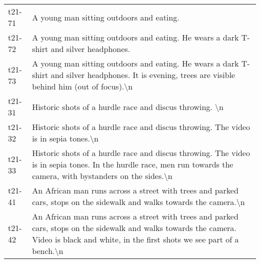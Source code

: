 \begin{tabular}{ll}
t21-71 &                                                                                                                                                                                                                                                                     A young man sitting outdoors and eating. \\
t21-72 &                                                                                                                                                                                                                      A young man sitting outdoors and eating. He wears a dark T-shirt and silver headphones. \\
t21-73 &                                                                                                                                                        A young man sitting outdoors and eating. He wears a dark T-shirt and silver headphones. It is evening, trees are visible behind him (out of focus).\textbackslash n \\
t21-31 &                                                                                                                                                                                                                                                      Historic shots of a hurdle race and discus throwing. \textbackslash n \\
t21-32 &                                                                                                                                                                                                                          Historic shots of a hurdle race and discus throwing. The video is in sepia tones.\textbackslash n \\
t21-33 &                                                                                                                                            Historic shots of a hurdle race and discus throwing. The video is in sepia tones. In the hurdle race, men run towards the camera, with bystanders on the sides.\textbackslash n \\
t21-41 &                                                                                                                                                                                        An African man runs across a street with trees and parked cars, stops on the sidewalk and walks towards the camera.\textbackslash n \\
t21-42 &                                                                                                                   An African man runs across a street with trees and parked cars, stops on the sidewalk and walks towards the camera. Video is black and white, in the first shots we see part of a bench.\textbackslash n \\

\end{tabular}
